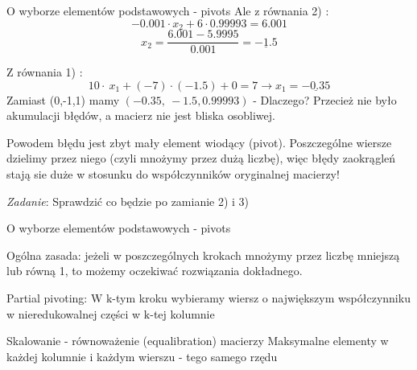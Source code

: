 \begin{frame}{O wyborze elementów podstawowych - pivots}
Ale z równania 2) :
$$
-0.001\cdot x_{2}+6\cdot 0.99993=6.001
$$
$$
x_{2}=\frac{6.001-5.9995}{0.001}=\underline{-1.5}
$$

Z równania 1) :
$$
10\cdot\ x_{1}+(-7)\cdot(-1.5)+0=7\rightarrow x_{1}=\underline{-0.35}
$$
Zamiast (0,-1,1) mamy $(-0.35,\ -1.5,0.99993)$ - Dlaczego? \newline 
Przecież nie było akumulacji błędów, a macierz nie jest bliska osobliwej.
\begin{alertblock}{}
Powodem błędu jest zbyt mały element wiodący (pivot). Poszczególne wiersze dzielimy przez niego (czyli mnożymy przez dużą liczbę), więc błędy zaokrągleń stają sie duże w stosunku do współczynników oryginalnej macierzy!
\end{alertblock}
\begin{flushright}
\textit{Zadanie}: Sprawdzić co będzie po zamianie 2) i 3) 
\end{flushright}
\end{frame}
\begin{frame}{ O wyborze elementów podstawowych - pivots}

Ogólna zasada: jeżeli w poszczególnych krokach mnożymy przez liczbę mniejszą lub równą 1, to możemy oczekiwać rozwiązania dokładnego.
\begin{exampleblock}{Partial pivoting:}
W $\mathrm{k}$-tym kroku wybieramy wiersz o największym współczynniku w nieredukowalnej części w $\mathrm{k}$-tej kolumnie

\end{exampleblock}

\begin{exampleblock}{Skalowanie - równoważenie (equalibration) macierzy}
Maksymalne elementy w każdej kolumnie i każdym wierszu - tego samego rzędu
\end{exampleblock}

\end{frame}
